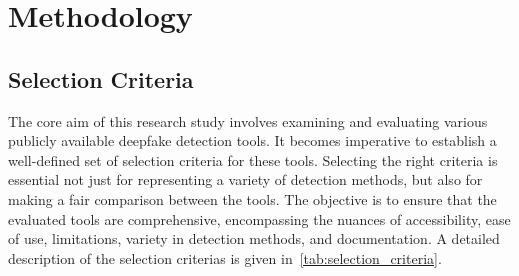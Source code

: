 
\chapter{Methodology}\label{chapter:methodology}

\section{Selection Criteria}
The core aim of this research study involves examining and evaluating
various publicly available deepfake detection tools. It becomes imperative
to establish a well-defined set of selection criteria for these tools.
Selecting the right criteria is essential not just for representing a variety
of detection methods, but also for making a fair comparison between the tools.
The objective is to ensure that the evaluated tools are comprehensive,
encompassing the nuances of accessibility, ease of use, limitations, variety
in detection methods, and documentation. A detailed description of the selection
criterias is given in~\autoref{tab:selection_criteria}.

